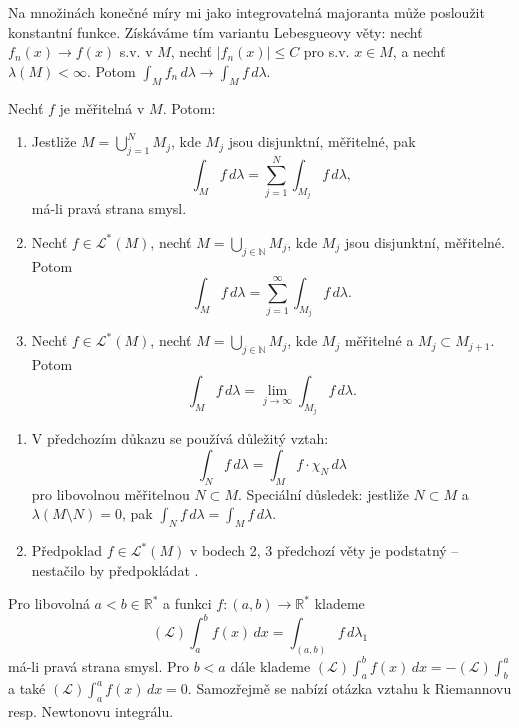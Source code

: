 \begin{poznamka}
Na množinách konečné míry mi jako integrovatelná majoranta může
posloužit konstantní funkce. Získáváme tím variantu Lebesgueovy věty:
nechť $f_n(x) \to f(x)$ s.v. v $M$, nechť $|f_n(x)| \le C$ pro s.v.
$x \in M$, a nechť $\lambda(M) < \infty$. Potom
$\int_M f_n \, d\lambda \to \int_M f \, d\lambda$.
\end{poznamka}

\begin{veta}
Nechť $f$ je měřitelná v $M$. Potom:
\begin{enumerate}[1.]
\item Jestliže $M = \bigcup_{j=1}^{N} M_j$, kde $M_j$ jsou
disjunktní, měřitelné, pak
\[
\int_M f \, d\lambda = \sum_{j=1}^{N} \int_{M_j} f \, d\lambda,
\]
má-li pravá strana smysl.
\item Nechť $f \in \mathcal{L}^*(M)$, nechť
$M = \bigcup_{j \in \mathbb{N}} M_j$, kde $M_j$ jsou disjunktní,
měřitelné. Potom
\[
\int_M f \, d\lambda = \sum_{j=1}^{\infty} \int_{M_j} f \, d\lambda.
\]
\item Nechť $f \in \mathcal{L}^*(M)$, nechť
$M = \bigcup_{j \in \mathbb{N}} M_j$, kde $M_j$ měřitelné a
$M_j \subset M_{j+1}$. Potom
\[
\int_M f \, d\lambda = \lim_{j \to \infty} \int_{M_j} f \, d\lambda.
\]
\end{enumerate}
\end{veta}

\begin{poznamka}
\begin{enumerate}[1.]
\item V předchozím důkazu se používá důležitý vztah:
\[
\int_N f \, d\lambda = \int_M f \cdot \chi_N \, d\lambda
\]
pro libovolnou měřitelnou $N \subset M$. Speciální důsledek: jestliže
$N \subset M$ a $\lambda(M \setminus N) = 0$, pak
$\int_N f \, d\lambda = \int_M f \, d\lambda$.

\item Předpoklad $f \in \mathcal{L}^*(M)$ v bodech 2, 3 předchozí
věty je podstatný -- nestačilo by předpokládat .
\end{enumerate}
\end{poznamka}

\begin{definice}
Pro libovolná $a < b \in \mathbb{R}^*$ a funkci $f : (a, b) \to
\mathbb{R}^*$ klademe
\[
(\mathscr{L}) \int_a^b f(x) \, dx = \int_{(a,b)} f \, d\lambda_1
\]
má-li pravá strana smysl. Pro $b < a$ dále klademe
$(\mathscr{L}) \int_a^b f(x) \, dx = -(\mathscr{L}) \int_b^a$ a také
$(\mathscr{L}) \int_a^a f(x) \, dx = 0$. Samozřejmě se nabízí otázka
vztahu k Riemannovu resp. Newtonovu integrálu.
\end{definice}

